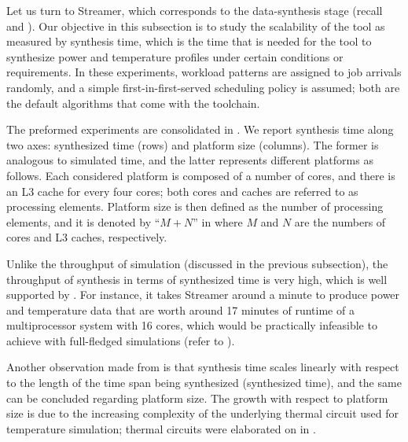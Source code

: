 
Let us turn to Streamer, which corresponds to the data-synthesis stage (recall
 and ). Our objective in this subsection is to
study the scalability of the tool as measured by synthesis time, which is the
time that is needed for the tool to synthesize power and temperature profiles
under certain conditions or requirements. In these experiments, workload
patterns are assigned to job arrivals randomly, and a simple
first-in-first-served scheduling policy is assumed; both are the default
algorithms that come with the toolchain.

The preformed experiments are consolidated in . We report
synthesis time along two axes: synthesized time (rows) and platform size
(columns). The former is analogous to simulated time, and the latter represents
different platforms as follows. Each considered platform is composed of a number
of cores, and there is an L3 cache for every four cores; both cores and caches
are referred to as processing elements. Platform size is then defined as the
number of processing elements, and it is denoted by ``$M + N$'' in
 where $M$ and $N$ are the numbers of cores and L3 caches,
respectively.

Unlike the throughput of simulation (discussed in the previous subsection), the
throughput of synthesis in terms of synthesized time is very high, which is well
supported by . For instance, it takes Streamer around a minute
to produce power and temperature data that are worth around 17 minutes of
runtime of a multiprocessor system with 16 cores, which would be practically
infeasible to achieve with full-fledged simulations (refer to ).

Another observation made from  is that synthesis time scales
linearly with respect to the length of the time span being synthesized
(synthesized time), and the same can be concluded regarding platform size. The
growth with respect to platform size is due to the increasing complexity of the
underlying thermal  circuit used for temperature simulation; thermal
circuits were elaborated on in .
